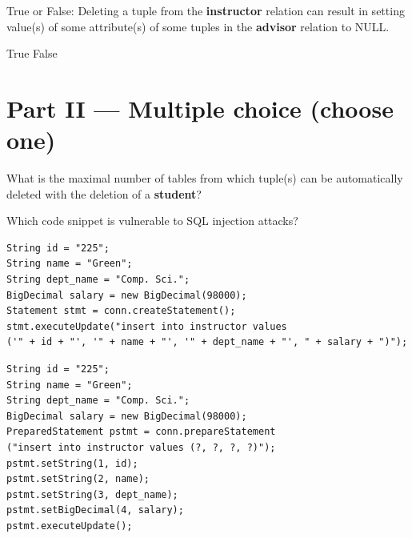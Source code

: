 \documentclass[12pt]{exam}
\begin{document}
\begin{questions}
\begin{minipage}{\linewidth}
\question[2]
True or False: Deleting a tuple from the \textbf{instructor} relation can result in setting value(s) of some attribute(s) 
of some tuples in the \textbf{advisor} relation to NULL.\par\vspace{0.5em}
\begin{checkboxes}
    \CorrectChoice True
    \choice False
\end{checkboxes}
\end{minipage}\vspace{1em}


\section*{Part II — Multiple choice (choose one)}

\begin{minipage}{\linewidth}
\question[3]
What is the maximal number of tables from which tuple(s) can be automatically deleted with the deletion of a \textbf{student}?\par\vspace{0.5em}
\begin{checkboxes}
\end{checkboxes}
\end{minipage}\vspace{1em}

\begin{minipage}{\linewidth}
\question[3]
Which code snippet is vulnerable to SQL injection attacks?\par\vspace{0.5em}
\begin{checkboxes} 
    \CorrectChoice \begin{verbatim}
String id = "225";
String name = "Green";
String dept_name = "Comp. Sci.";
BigDecimal salary = new BigDecimal(98000);
Statement stmt = conn.createStatement();
stmt.executeUpdate("insert into instructor values 
('" + id + "', '" + name + "', '" + dept_name + "', " + salary + ")");
    \end{verbatim} %
    \choice \begin{verbatim}
String id = "225";
String name = "Green";
String dept_name = "Comp. Sci.";
BigDecimal salary = new BigDecimal(98000);
PreparedStatement pstmt = conn.prepareStatement
("insert into instructor values (?, ?, ?, ?)");
pstmt.setString(1, id);
pstmt.setString(2, name);
pstmt.setString(3, dept_name);
pstmt.setBigDecimal(4, salary);
pstmt.executeUpdate();
    \end{verbatim}
\end{checkboxes}
\end{minipage}\vspace{1em}


\end{questions}
\end{document}
